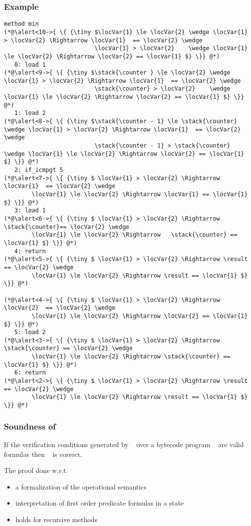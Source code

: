 \documentclass{beamer}
\begin{document}
\begin{frame}\frametitle{Example}
\begin{lstlisting}[language=jvmis]
method min
(*@\alert<10->{ \{ {\tiny $\locVar{1} \le \locVar{2} \wedge \locVar{1} > \locVar{2} \Rightarrow \locVar{1}  == \locVar{2} \wedge 
                          \locVar{1} > \locVar{2}    \wedge \locVar{1} \le \locVar{2} \Rightarrow \locVar{2} == \locVar{1} $} \}} @*)
   0: load 1
(*@\alert<9->{ \{ {\tiny $\stack{\counter } \le \locVar{2} \wedge \locVar{1} > \locVar{2} \Rightarrow \locVar{1}  == \locVar{2} \wedge 
                          \stack{\counter} > \locVar{2}    \wedge \locVar{1} \le \locVar{2} \Rightarrow \locVar{2} == \locVar{1} $} \}} @*)
   1: load 2
(*@\alert<8->{ \{ {\tiny $\stack{\counter - 1} \le \stack{\counter} \wedge \locVar{1} > \locVar{2} \Rightarrow \locVar{1}  == \locVar{2} \wedge 
                          \stack{\counter - 1} > \stack{\counter}    \wedge \locVar{1} \le \locVar{2} \Rightarrow \locVar{2} == \locVar{1} $} \}} @*)
   2: if_icmpgt 5
(*@\alert<7->{ \{ {\tiny $ \locVar{1} > \locVar{2} \Rightarrow \locVar{1}  == \locVar{2} \wedge 
		\locVar{1} \le \locVar{2} \Rightarrow \locVar{1} == \locVar{1} $} \}} @*)
   3: load 1
(*@\alert<6->{ \{ {\tiny $ \locVar{1} > \locVar{2} \Rightarrow \stack{\counter}== \locVar{2} \wedge 
		\locVar{1} \le \locVar{2} \Rightarrow   \stack{\counter} == \locVar{1} $} \}} @*)
   4: return
(*@\alert<5->{ \{ {\tiny $ \locVar{1} > \locVar{2} \Rightarrow \result == \locVar{2} \wedge 
		\locVar{1} \le \locVar{2} \Rightarrow \result == \locVar{1} $} \}} @*)

(*@\alert<4->{ \{ {\tiny $ \locVar{1} > \locVar{2} \Rightarrow \locVar{2}  == \locVar{2} \wedge 
		\locVar{1} \le \locVar{2} \Rightarrow \locVar{2} == \locVar{1} $} \}} @*)
   5: load 2
(*@\alert<3->{ \{ {\tiny $ \locVar{1} > \locVar{2} \Rightarrow \stack{\counter} == \locVar{2} \wedge 
		\locVar{1} \le \locVar{2} \Rightarrow \stack{\counter} == \locVar{1} $} \}} @*)
   6: return
(*@\alert<2->{ \{ {\tiny $ \locVar{1} > \locVar{2} \Rightarrow \result == \locVar{2} \wedge 
		\locVar{1} \le \locVar{2} \Rightarrow \result == \locVar{1} $} \}} @*)
\end{lstlisting}
\end{frame}

\begin{frame}\frametitle{Soundness of \wpi}
 \begin{definition}
If the verification conditions generated by \wpi~ over a bytecode program \program~ are 
valid formulas then \program~ is correct.
\end{definition}

The proof done w.r.t.  
\begin{itemize}
   \item a formalization of the operational semantics %
   \item interpretation of first order predicate formulas in a state 
   \item holds  for recursive methods
 \end{itemize}

\end{frame}
\end{document}
